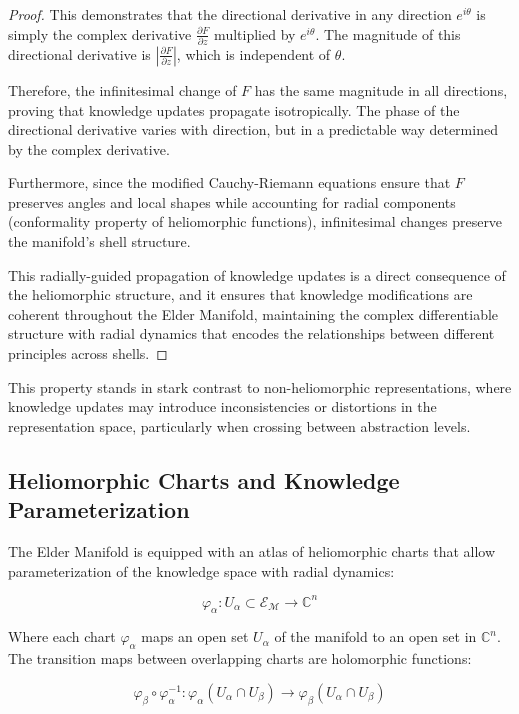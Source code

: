 \begin{proof}
This demonstrates that the directional derivative in any direction $e^{i\theta}$ is simply the complex derivative $\frac{\partial F}{\partial z}$ multiplied by $e^{i\theta}$. The magnitude of this directional derivative is $\left|\frac{\partial F}{\partial z}\right|$, which is independent of $\theta$.

Therefore, the infinitesimal change of $F$ has the same magnitude in all directions, proving that knowledge updates propagate isotropically. The phase of the directional derivative varies with direction, but in a predictable way determined by the complex derivative.

Furthermore, since the modified Cauchy-Riemann equations ensure that $F$ preserves angles and local shapes while accounting for radial components (conformality property of heliomorphic functions), infinitesimal changes preserve the manifold's shell structure.

This radially-guided propagation of knowledge updates is a direct consequence of the heliomorphic structure, and it ensures that knowledge modifications are coherent throughout the Elder Manifold, maintaining the complex differentiable structure with radial dynamics that encodes the relationships between different principles across shells.
\end{proof}

This property stands in stark contrast to non-heliomorphic representations, where knowledge updates may introduce inconsistencies or distortions in the representation space, particularly when crossing between abstraction levels.

\subsection{Heliomorphic Charts and Knowledge Parameterization}

The Elder Manifold is equipped with an atlas of heliomorphic charts that allow parameterization of the knowledge space with radial dynamics:

\begin{equation}
\varphi_{\alpha}: U_{\alpha} \subset \mathcal{E}_{\mathcal{M}} \rightarrow \mathbb{C}^n
\end{equation}

Where each chart $\varphi_{\alpha}$ maps an open set $U_{\alpha}$ of the manifold to an open set in $\mathbb{C}^n$. The transition maps between overlapping charts are holomorphic functions:

\begin{equation}
\varphi_{\beta} \circ \varphi_{\alpha}^{-1}: \varphi_{\alpha}(U_{\alpha} \cap U_{\beta}) \rightarrow \varphi_{\beta}(U_{\alpha} \cap U_{\beta})
\end{equation}

